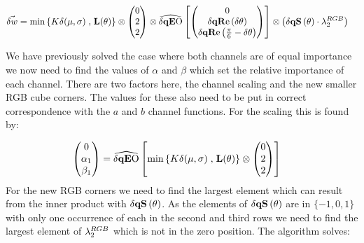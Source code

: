 \begin{align*}
\dW    &=  \min\left\{K \delta(\mu,\sigma) \right. ,  \left. \mathbf{L}(\theta) \right\} 
 \otimes 
        \begin{pmatrix}  0   \\   2   \\  2    \\ \end{pmatrix} 
  \otimes
        \dqEO\left[   \begin{pmatrix}  0   \\ \dqRe[ \thetaA ]  \\ \dqRe[ \Pii{6} -\thetaA]   \\ \end{pmatrix}  \right]
 \otimes
        \left( \dqs[\theta]  \cdot \discard^{RGB}_2 \right) 
\end{align*}

We have previously solved the case where both channels are of equal importance we now need to find the values of $\alpha$ and $\beta$ which set the relative importance of each channel. There are two factors here, the channel scaling and the new smaller RGB cube corners. The values for these also need to be put in correct correspondence with the $a$ and $b$ channel functions. For the scaling this is found by:

\begin{align*}
 \begin{pmatrix}  0   \\   \alpha_1   \\  \beta_1   \\ \end{pmatrix}     &=  
\dqEO\left[  \min\left\{K \delta(\mu,\sigma) \right. ,  \left. \mathbf{L}(\theta) \right\} 
 \otimes 
        \begin{pmatrix}  0   \\   2   \\  2    \\ \end{pmatrix} \right]
\end{align*}
For the new RGB corners we need to find the largest element which can result from the inner product with $\dqs[\theta]$. As the elements of $\dqs[\theta]$ are in $\{-1,0,1\}$ with only one occurrence of each in the second and third rows we need to find the largest element of $\lambda^{RGB}_2$ which is not in the zero position. The algorithm solves:

